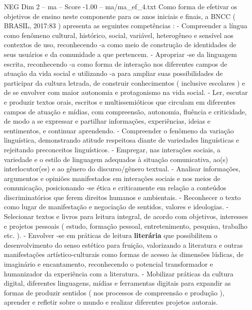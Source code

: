 \begin{textsample}{NEG Dim 2 – ma – Score -1.00 – ma/ma\_ef\_4.txt}
Como forma de efetivar os objetivos de ensino neste componente para os anos iniciais e finais, a BNCC ( BRASIL, 2017:83 ) apresenta as seguintes competências : - Compreender a língua como fenômeno cultural, histórico, social, variável, heterogêneo e sensível aos contextos de uso, reconhecendo -a como meio de construção de identidades de seus usuários e da comunidade a que pertencem. - Apropriar -se da linguagem escrita, reconhecendo -a como forma de interação nos diferentes campos de atuação da vida social e utilizando -a para ampliar suas possibilidades de participar da cultura letrada, de construir conhecimentos ( inclusive escolares ) e de se envolver com maior autonomia e protagonismo na vida social. - Ler, escutar e produzir textos orais, escritos e multissemióticos que circulam em diferentes campos de atuação e mídias, com compreensão, autonomia, fluência e criticidade, de modo a se expressar e partilhar informações, experiências, ideias e sentimentos, e continuar aprendendo. - Compreender o fenômeno da variação linguística, demonstrando atitude respeitosa diante de variedades linguísticas e rejeitando preconceitos linguísticos. - Empregar, nas interações sociais, a variedade e o estilo de linguagem adequados à situação comunicativa, ao(s) interlocutor(es) e ao gênero do discurso/gênero textual. - Analisar informações, argumentos e opiniões manifestados em interações sociais e nos meios de comunicação, posicionando -se ética e criticamente em relação a conteúdos discriminatórios que ferem direitos humanos e ambientais. - Reconhecer o texto como lugar de manifestação e negociação de sentidos, valores e ideologias. - Selecionar textos e livros para leitura integral, de acordo com objetivos, interesses e projetos pessoais ( estudo, formação pessoal, entretenimento, pesquisa, trabalho etc. ). - Envolver -se em práticas de leitura \textbf{literária} que possibilitem o desenvolvimento do senso estético para fruição, valorizando a literatura e outras manifestações artístico-culturais como formas de acesso às dimensões lúdicas, de imaginário e encantamento, reconhecendo o potencial transformador e humanizador da experiência com a literatura. - Mobilizar práticas da cultura digital, diferentes linguagens, mídias e ferramentas digitais para expandir as formas de produzir sentidos ( nos processos de compreensão e produção ), aprender e refletir sobre o mundo e realizar diferentes projetos autorais.

\end{textsample}
